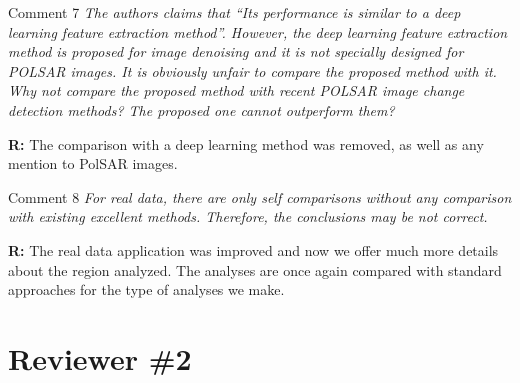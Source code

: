 \documentclass[11pt]{report}
\begin{document}
\vspace{0.3cm}

\medskip
\begin{mybox}{Comment 7}
\textit{The authors claims that “Its performance is similar to a deep learning feature extraction method”. However, the deep
learning feature extraction method is proposed for image denoising and it is not specially designed for POLSAR images.
It is obviously unfair to compare the proposed method with it. Why not compare the proposed method with recent
POLSAR image change detection methods? The proposed one cannot outperform them?}


\medskip
\textbf{R:} The comparison with a deep learning method was removed, as well as any mention to PolSAR images.

\medskip

\end{mybox}

\vspace{0.3cm}

\medskip
\begin{mybox}{Comment 8}
\textit{For real data, there are only self comparisons without any comparison with existing excellent methods. Therefore, the
conclusions may be not correct.}


\medskip
\textbf{R:} The real data application was improved and now we offer much more details about the region analyzed. The analyses are once again compared with standard approaches for the type of analyses we make.

\medskip

\end{mybox}



\newpage



\vspace{0.25cm}

\section*{Reviewer \#2}
\end{document}
